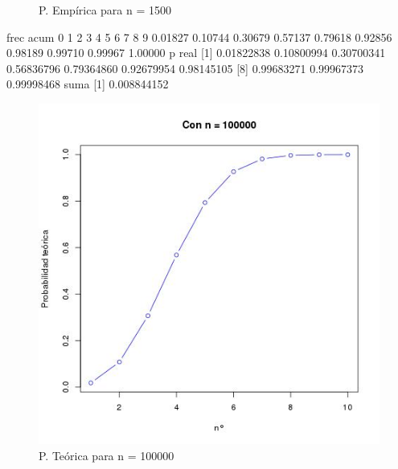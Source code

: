 \documentclass[letter,10pt]{article}
\begin{document}
\begin{itemize}
\begin{minipage}{\linewidth}
\begin{minipage}{0.45\linewidth}
\begin{figure}[H]
              \caption{P. Emp\'irica para n = 1500}
          \end{figure}
      \end{minipage}
  \end{minipage}

  
frec acum
      0       1       2       3       4       5       6       7       8       9 
0.01827 0.10744 0.30679 0.57137 0.79618 0.92856 0.98189 0.99710 0.99967 1.00000 
 p real
 [1] 0.01822838 0.10800994 0.30700341 0.56836796 0.79364860 0.92679954 0.98145105
 [8] 0.99683271 0.99967373 0.99998468
 suma
[1] 0.008844152
 
 
  \begin{minipage}{\linewidth}
      \centering
      \begin{minipage}{0.45\linewidth}
          \begin{figure}[H]
              \includegraphics[width=\linewidth]{p4_teo_100000.jpg}
              \caption{P. Te\'orica para n = 100000}
          \end{figure}
      \end{minipage}
      \hspace{0.05\linewidth}
      \begin{minipage}{0.45\linewidth}
          \begin{figure}[H]

\end{figure}
\end{minipage}
\end{minipage}
\end{itemize}
\end{document}
